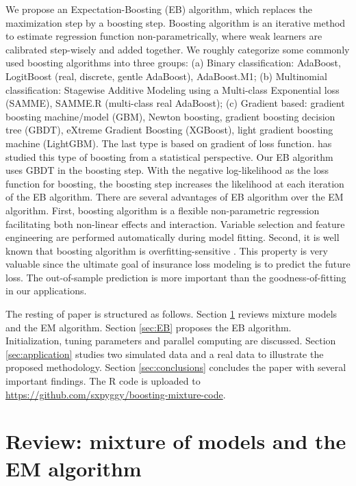 \documentclass[11pt]{article}
\numberwithin{equation}{section}
\begin{document}
We propose an Expectation-Boosting (EB) algorithm, which replaces the maximization step by a boosting step. 
Boosting algorithm is an iterative method to estimate regression function non-parametrically, where weak learners are calibrated step-wisely and added together.
We roughly categorize some commonly used boosting algorithms into three groups: 
(a) Binary classification: {AdaBoost}, LogitBoost (real, discrete, gentle AdaBoost), AdaBoost.M1; 
(b) Multinomial classification: Stagewise Additive Modeling using a Multi-class Exponential loss (SAMME), SAMME.R (multi-class real AdaBoost); 
(c) {Gradient based}: {gradient boosting machine/model (GBM)}, Newton boosting, gradient boosting decision tree (GBDT), {eXtreme Gradient Boosting (XGBoost)}, {light gradient boosting machine (LightGBM)}.
The last type is based on {gradient of loss function}.  \citet{friedman2001greedy} has studied this type of boosting from a statistical perspective. Our EB algorithm uses GBDT in the boosting step.
With the negative log-likelihood as the loss function for boosting, the boosting step increases the likelihood at each iteration of the EB algorithm. 
There are several advantages of EB algorithm over the EM algorithm. 
First, boosting algorithm is a flexible non-parametric regression facilitating both non-linear effects and interaction. Variable selection and feature engineering are performed automatically during model fitting. 
Second, it is well known that boosting algorithm is overfitting-sensitive \citep{buehlmann:2003}. This property is very valuable since the ultimate goal of insurance loss modeling is to predict the future loss.
The out-of-sample prediction is more important than the goodness-of-fitting in our applications. 



The resting of paper is structured as follows. 
Section \ref{sec:review} reviews mixture models and the EM algorithm. 
Section \ref{sec:EB} proposes the EB algorithm. Initialization, tuning parameters and parallel computing are discussed.   
Section \ref{sec:application} studies two simulated data and a real data to illustrate the proposed methodology. Section \ref{sec:conclusions} concludes the paper with several important findings.  The R code is uploaded to \url{https://github.com/sxpyggy/boosting-mixture-code}.


\section{Review: mixture of models and the EM algorithm}\label{sec:review}
\end{document}
